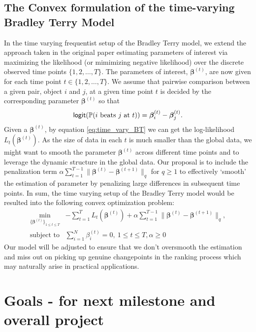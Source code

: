 \documentclass{article}
\begin{document}
\subsection{The Convex formulation of the time-varying Bradley Terry Model}
In the time varying frequentist setup of the Bradley Terry model, we extend the approach taken in the original paper \cite{bradley1952rank} estimating parameters of interest via maximizing the likelihood (or mimimizing negative likelihood) over the discrete observed time points $\{1, 2, \ldots, T\}$. The parameters of interest, $\bm{\beta}^{(t)}$, are now given for each time point $t \in \{1, 2, \ldots, T\}$. We assume that pairwise comparison between a given pair, object $i$ and $j$, at a given time point $t$ is decided by the corresponding parameter $\bm{\beta}^{(t)}$ so that
\begin{equation}
    \logit(\prob{i \text{ beats } j \text{ at } t}) = \bm{\beta}^{(t)}_i - \bm{\beta}^{(t)}_j.
\label{eq:time_vary_BT}
\end{equation}
Given a $\bm{\beta}^{(t)}$, by equation \eqref{eq:time_vary_BT} we can get the log-likelihood $L_t(\bm{\beta}^{(t)})$. As the size of data in each $t$ is much smaller than the global data, we might want to smooth the parameter $\bm{\beta}^{(t)}$ across different time points and to leverage the dynamic structure in the global data. Our proposal is to include the penalization term $\alpha\sum_{t = 1}^{T-1} \|\bm{\beta}^{(t)} - \bm{\beta}^{(t+1)}\|_q$ for $q \ge 1$ to effectively `smooth' the estimation of parameter by penalizing large differences in subsequent time points. In sum, the time varying setup of the Bradley Terry model would be resulted into the following convex optimization problem:
\begin{equation}\label{eq:opt_original}
\begin{split}
\min_{\{\bm{\beta}^{(t)}\}_{1\leq t \leq T}} &-\sum_{t = 1}^{T} L_t(\bm{\beta}^{(t)}) + \alpha\sum_{t = 1}^{T-1} \|\bm{\beta}^{(t)} - \bm{\beta}^{(t+1)}\|_q, \\
\text{subject to} &\sum_{i=1}^N\beta^{(t)}_{i} = 0,\ 1\leq t\leq T, \alpha \ge 0
\end{split}
\end{equation}
Our model will be adjusted to ensure that we don't oversmooth the estimation and miss out on picking up genuine changepoints in the ranking process which may naturally arise in practical applications.

\section{Goals - for next milestone and overall project}
\end{document}

